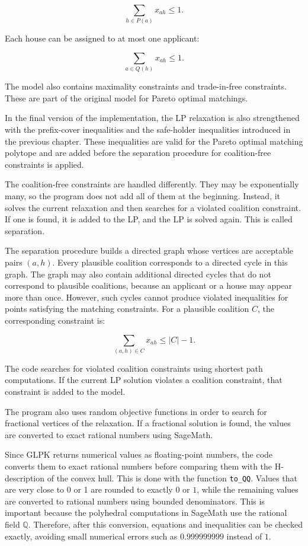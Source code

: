 \documentclass[12pt]{report}
\numberwithin{algorithm}{chapter}
\begin{document}
	\[
	\sum_{h \in P(a)} x_{ah} \leq 1.
	\]
	
	Each house can be assigned to at most one applicant:
	
	\[
	\sum_{a \in Q(h)} x_{ah} \leq 1.
	\]
	
	The model also contains maximality constraints and trade-in-free constraints. These are part of the original model for Pareto optimal matchings.
	
	In the final version of the implementation, the LP relaxation is also strengthened with the prefix-cover inequalities and the safe-holder inequalities introduced in the previous chapter. These inequalities are valid for the Pareto optimal matching polytope and are added before the separation procedure for coalition-free constraints is applied.
	
	The coalition-free constraints are handled differently. They may be exponentially many, so the program does not add all of them at the beginning. Instead, it solves the current relaxation and then searches for a violated coalition constraint. If one is found, it is added to the LP, and the LP is solved again. This is called separation.
	
	The separation procedure builds a directed graph whose vertices are acceptable pairs $(a,h)$. Every plausible coalition corresponds to a directed cycle in this graph. The graph may also contain additional directed cycles that do not correspond to plausible coalitions, because an applicant or a house may appear more than once. However, such cycles cannot produce violated inequalities for points satisfying the matching constraints. For a plausible coalition $C$, the corresponding constraint is:
	
	\[
	\sum_{(a,h)\in C} x_{ah} \leq |C|-1.
	\]
	
	The code searches for violated coalition constraints using shortest path computations. If the current LP solution violates a coalition constraint, that constraint is added to the model.
	
	The program also uses random objective functions in order to search for fractional vertices of the relaxation. If a fractional solution is found, the values are converted to exact rational numbers using SageMath.
	
	Since GLPK returns numerical values as floating-point numbers, the code converts them to exact rational numbers before comparing them with the H-description of the convex hull. This is done with the function \texttt{to\_QQ}. Values that are very close to 0 or 1 are rounded to exactly $0$ or $1$, while the remaining values are converted to rational numbers using bounded denominators. This is important because the polyhedral computations in SageMath use the rational field $\mathbb{Q}$. Therefore, after this conversion, equations and inequalities can be checked exactly, avoiding small numerical errors such as $0.999999999$ instead of $1$.
	
\end{document}
